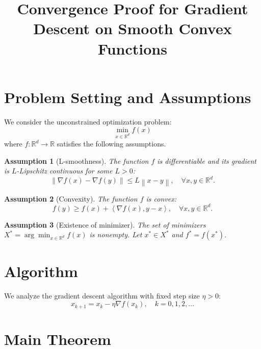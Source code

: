 \documentclass{article}
\newtheorem{assumption}{Assumption}
\newcommand{\R}{\mathbb{R}}
\newcommand{\norm}[1]{\left\| #1 \right\|}
\newcommand{\inner}[1]{\left\langle #1 \right\rangle}
\begin{document}
\title{Convergence Proof for Gradient Descent on Smooth Convex Functions}
\author{}
\date{}
\maketitle

\section{Problem Setting and Assumptions}

We consider the unconstrained optimization problem:
\begin{equation}
    \min_{x \in \R^d} f(x)
\end{equation}
where $f: \R^d \to \R$ satisfies the following assumptions.

\begin{assumption}[L-smoothness] \label{assump:smooth}
    The function $f$ is differentiable and its gradient is $L$-Lipschitz continuous for some $L > 0$:
    \begin{equation}
        \norm{\nabla f(x) - \nabla f(y)} \le L \norm{x - y}, \quad \forall x, y \in \R^d.
    \end{equation}
\end{assumption}

\begin{assumption}[Convexity] \label{assump:convex}
    The function $f$ is convex:
    \begin{equation}
        f(y) \ge f(x) + \inner{\nabla f(x), y - x}, \quad \forall x, y \in \R^d.
    \end{equation}
\end{assumption}

\begin{assumption}[Existence of minimizer] \label{assump:minimizer}
    The set of minimizers $X^* = \arg\min_{x \in \R^d} f(x)$ is nonempty. Let $x^* \in X^*$ and $f^* = f(x^*)$.
\end{assumption}

\section{Algorithm}

We analyze the gradient descent algorithm with fixed step size $\eta > 0$:
\begin{equation}
    x_{k+1} = x_k - \eta \nabla f(x_k), \quad k = 0, 1, 2, \dots
\end{equation}

\section{Main Theorem}
\end{document}
